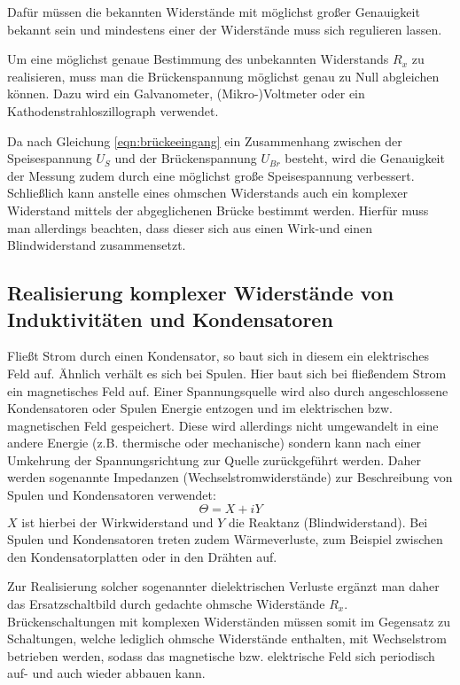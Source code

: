 Dafür müssen die bekannten Widerstände mit möglichst großer Genauigkeit bekannt sein und mindestens einer der Widerstände muss sich regulieren lassen.

Um eine möglichst genaue Bestimmung des unbekannten Widerstands $R_x$ zu realisieren, muss man die Brückenspannung möglichst genau zu Null abgleichen können.
Dazu wird ein Galvanometer, (Mikro-)Voltmeter oder ein Kathodenstrahloszillograph verwendet.

Da nach Gleichung \eqref{eqn:brückeeingang} ein Zusammenhang zwischen der Speisespannung $U_S$ und der Brückenspannung $U_{Br}$ besteht, wird die Genauigkeit der Messung zudem durch eine möglichst große Speisespannung verbessert.
Schließlich kann anstelle eines ohmschen Widerstands auch ein komplexer Widerstand mittels der abgeglichenen Brücke bestimmt werden. Hierfür muss man allerdings beachten, dass dieser sich aus einen Wirk-und einen Blindwiderstand zusammensetzt.

\subsection{Realisierung komplexer Widerstände von Induktivitäten und Kondensatoren}
\label{sec:komplexewiderstände}
Fließt Strom durch einen Kondensator, so baut sich in diesem ein elektrisches Feld auf. Ähnlich verhält es sich bei Spulen. Hier baut sich bei fließendem Strom ein magnetisches Feld auf.
Einer Spannungsquelle wird also durch angeschlossene Kondensatoren oder Spulen Energie entzogen und im elektrischen bzw. magnetischen Feld gespeichert. Diese wird allerdings nicht umgewandelt in eine andere Energie (z.B. thermische oder mechanische) sondern kann nach einer Umkehrung der Spannungsrichtung zur Quelle zurückgeführt werden.
Daher werden sogenannte Impedanzen (Wechselstromwiderstände) zur Beschreibung von Spulen und Kondensatoren verwendet:
\begin{equation}
\Theta= X+iY
\end{equation}
$X$ ist hierbei der Wirkwiderstand und $Y$ die Reaktanz (Blindwiderstand).
Bei Spulen und Kondensatoren treten zudem Wärmeverluste, zum Beispiel zwischen den Kondensatorplatten
oder in den Drähten auf.

Zur Realisierung solcher sogenannter dielektrischen Verluste
ergänzt man daher das Ersatzschaltbild durch gedachte ohmsche Widerstände $R_x$.
Brückenschaltungen mit komplexen Widerständen müssen somit im Gegensatz zu Schaltungen, welche lediglich ohmsche Widerstände enthalten, mit Wechselstrom betrieben werden, sodass das magnetische bzw. elektrische Feld sich periodisch auf- und auch wieder abbauen kann.

